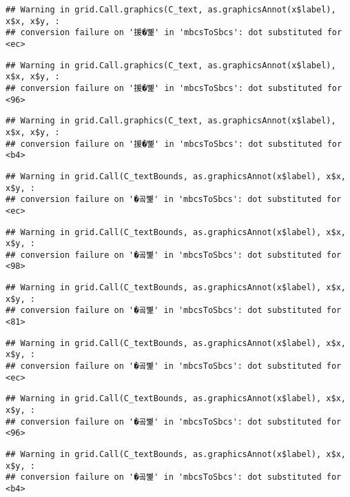 \documentclass[
]{article}
\begin{document}
\begin{verbatim}
## Warning in grid.Call.graphics(C_text, as.graphicsAnnot(x$label), x$x, x$y, :
## conversion failure on '援�뼱' in 'mbcsToSbcs': dot substituted for <ec>
\end{verbatim}

\begin{verbatim}
## Warning in grid.Call.graphics(C_text, as.graphicsAnnot(x$label), x$x, x$y, :
## conversion failure on '援�뼱' in 'mbcsToSbcs': dot substituted for <96>
\end{verbatim}

\begin{verbatim}
## Warning in grid.Call.graphics(C_text, as.graphicsAnnot(x$label), x$x, x$y, :
## conversion failure on '援�뼱' in 'mbcsToSbcs': dot substituted for <b4>
\end{verbatim}

\begin{verbatim}
## Warning in grid.Call(C_textBounds, as.graphicsAnnot(x$label), x$x, x$y, :
## conversion failure on '�곸뼱' in 'mbcsToSbcs': dot substituted for <ec>
\end{verbatim}

\begin{verbatim}
## Warning in grid.Call(C_textBounds, as.graphicsAnnot(x$label), x$x, x$y, :
## conversion failure on '�곸뼱' in 'mbcsToSbcs': dot substituted for <98>
\end{verbatim}

\begin{verbatim}
## Warning in grid.Call(C_textBounds, as.graphicsAnnot(x$label), x$x, x$y, :
## conversion failure on '�곸뼱' in 'mbcsToSbcs': dot substituted for <81>
\end{verbatim}

\begin{verbatim}
## Warning in grid.Call(C_textBounds, as.graphicsAnnot(x$label), x$x, x$y, :
## conversion failure on '�곸뼱' in 'mbcsToSbcs': dot substituted for <ec>
\end{verbatim}

\begin{verbatim}
## Warning in grid.Call(C_textBounds, as.graphicsAnnot(x$label), x$x, x$y, :
## conversion failure on '�곸뼱' in 'mbcsToSbcs': dot substituted for <96>
\end{verbatim}

\begin{verbatim}
## Warning in grid.Call(C_textBounds, as.graphicsAnnot(x$label), x$x, x$y, :
## conversion failure on '�곸뼱' in 'mbcsToSbcs': dot substituted for <b4>
\end{verbatim}
\end{document}
